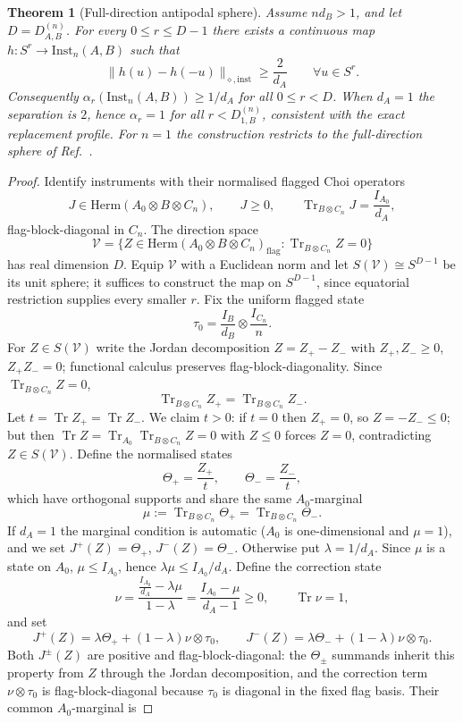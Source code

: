 \documentclass[11pt,a4paper]{article}
\newtheorem{theorem}{Theorem}[section]
\newcommand{\Herm}{\mathrm{Herm}}
\newcommand{\Inst}{\mathrm{Inst}}
\newcommand{\Tr}{\operatorname{Tr}}
\begin{document}
\begin{theorem}[Full-direction antipodal sphere]
\label{thm:full-direction}
Assume $nd_B>1$, and let $D=D_{A,B}^{(n)}$. For every $0\le r\le D-1$ there exists a continuous map $h:S^r\to\Inst_n(A,B)$ such that
\[
\|h(u)-h(-u)\|_{\diamond,\mathrm{inst}}\ge\frac2{d_A}
\qquad\forall u\in S^r.
\]
Consequently $\alpha_r(\Inst_n(A,B))\ge1/d_A$ for all $0\le r<D$. When $d_A=1$ the separation is $2$, hence $\alpha_r=1$ for all $r<D_{1,B}^{(n)}$, consistent with the exact replacement profile. For $n=1$ the construction restricts to the full-direction sphere of Ref.~\cite{CompanionChannels}.
\end{theorem}

\begin{proof}
Identify instruments with their normalised flagged Choi operators
\[
J\in\Herm(A_0\otimes B\otimes C_n),\qquad J\ge0,\qquad
\Tr_{B\otimes C_n}J=\frac{I_{A_0}}{d_A},
\]
flag-block-diagonal in $C_n$. The direction space
\[
\mathcal V=\big\{Z\in\Herm(A_0\otimes B\otimes C_n)_{\mathrm{flag}}:\Tr_{B\otimes C_n}Z=0\big\}
\]
has real dimension $D$. Equip $\mathcal V$ with a Euclidean norm and let $S(\mathcal V)\cong S^{D-1}$ be its unit sphere; it suffices to construct the map on $S^{D-1}$, since equatorial restriction supplies every smaller $r$. Fix the uniform flagged state
\[
\tau_0=\frac{I_B}{d_B}\otimes\frac{I_{C_n}}n.
\]
For $Z\in S(\mathcal V)$ write the Jordan decomposition $Z=Z_+-Z_-$ with $Z_+,Z_-\ge0$, $Z_+Z_-=0$; functional calculus preserves flag-block-diagonality. Since $\Tr_{B\otimes C_n}Z=0$,
\[
\Tr_{B\otimes C_n}Z_+=\Tr_{B\otimes C_n}Z_-.
\]
Let $t=\Tr Z_+=\Tr Z_-$. We claim $t>0$: if $t=0$ then $Z_+=0$, so $Z=-Z_-\le0$; but then $\Tr Z=\Tr_{A_0}\Tr_{B\otimes C_n}Z=0$ with $Z\le0$ forces $Z=0$, contradicting $Z\in S(\mathcal V)$. Define the normalised states
\[
\Theta_+=\frac{Z_+}{t},\qquad \Theta_-=\frac{Z_-}{t},
\]
which have orthogonal supports and share the same $A_0$-marginal
\[
\mu:=\Tr_{B\otimes C_n}\Theta_+=\Tr_{B\otimes C_n}\Theta_-.
\]
If $d_A=1$ the marginal condition is automatic ($A_0$ is one-dimensional and $\mu=1$), and we set $J^+(Z)=\Theta_+$, $J^-(Z)=\Theta_-$. Otherwise put $\lambda=1/d_A$. Since $\mu$ is a state on $A_0$, $\mu\le I_{A_0}$, hence $\lambda\mu\le I_{A_0}/d_A$. Define the correction state
\[
\nu=\frac{\frac{I_{A_0}}{d_A}-\lambda\mu}{1-\lambda}
=\frac{I_{A_0}-\mu}{d_A-1}\ge0,
\qquad \Tr\nu=1,
\]
and set
\[
J^+(Z)=\lambda\Theta_++(1-\lambda)\nu\otimes\tau_0,\qquad
J^-(Z)=\lambda\Theta_-+(1-\lambda)\nu\otimes\tau_0.
\]
Both $J^\pm(Z)$ are positive and flag-block-diagonal: the $\Theta_\pm$ summands inherit this property from $Z$ through the Jordan decomposition, and the correction term $\nu\otimes\tau_0$ is flag-block-diagonal because $\tau_0$ is diagonal in the fixed flag basis. Their common $A_0$-marginal is

\end{proof}
\end{document}

